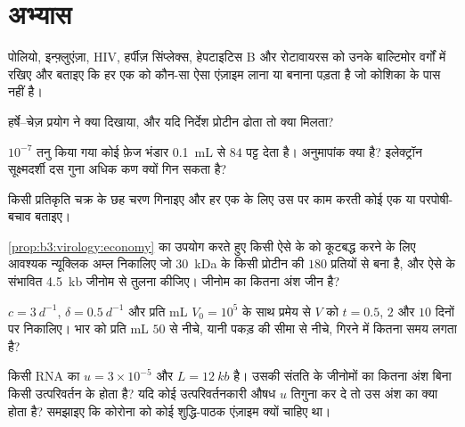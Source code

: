 \section{अभ्यास}

\begin{exercise}[$\star$]\label{exo:b3:virology:1}
पोलियो, इन्फ़्लुएंज़ा, HIV, हर्पीज़ सिंप्लेक्स, हेपटाइटिस B और रोटावायरस
को उनके बाल्टिमोर वर्गों में रखिए और बताइए कि हर एक को कौन-सा ऐसा
एंज़ाइम लाना या बनाना पड़ता है जो कोशिका के पास नहीं है।
\end{exercise}

\begin{exercise}[$\star$]\label{exo:b3:virology:2}
हर्षे--चेज़ प्रयोग ने क्या दिखाया, और यदि निर्देश प्रोटीन ढोता तो क्या
मिलता?
\end{exercise}

\begin{exercise}[$\star$]\label{exo:b3:virology:3}
$10^{-7}$ तनु किया गया कोई फ़ेज भंडार \qty{0.1}{mL} से $84$ पट्ट देता है।
अनुमापांक क्या है? इलेक्ट्रॉन सूक्ष्मदर्शी दस गुना अधिक कण क्यों गिन
सकता है?
\end{exercise}

\begin{exercise}[$\star$]\label{exo:b3:virology:4}
किसी प्रतिकृति चक्र के छह चरण गिनाइए और हर एक के लिए उस पर काम करती कोई
एक  या परपोषी-बचाव बताइए।
\end{exercise}

\begin{exercise}[$\star\star$]\label{exo:b3:virology:5}
\cref{prop:b3:virology:economy} का उपयोग करते हुए किसी ऐसे  के
 को कूटबद्ध करने के लिए आवश्यक न्यूक्लिक अम्ल निकालिए जो
\qty{30}{kDa} के किसी प्रोटीन की $180$ प्रतियों से बना है, और ऐसे 
के संभावित \qty{4.5}{kb} जीनोम से तुलना कीजिए। जीनोम का कितना अंश
 जीन है?
\end{exercise}

\begin{exercise}[$\star\star$]\label{exo:b3:virology:6}
$c = \qty{3}{d^{-1}}$, $\delta = \qty{0.5}{d^{-1}}$ और प्रति mL $V_{0} =
10^{5}$ के साथ प्रमेय से $V$ को $t = 0.5$, $2$ और
$10$ दिनों पर निकालिए। भार को प्रति mL $50$ से नीचे, यानी पकड़ की
सीमा से नीचे, गिरने में कितना समय लगता है?
\end{exercise}

\begin{exercise}[$\star\star$]\label{exo:b3:virology:7}
किसी RNA  का $u = 3\times 10^{-5}$ और $L = \qty{12}{kb}$ है। उसकी
संतति के जीनोमों का कितना अंश बिना किसी उत्परिवर्तन के होता है? यदि कोई
उत्परिवर्तनकारी औषध $u$ तिगुना कर दे तो उस अंश का क्या होता है? समझाइए
कि कोरोना  को कोई शुद्धि-पाठक एंज़ाइम क्यों चाहिए था।
\end{exercise}

